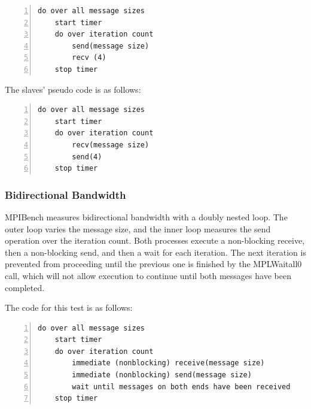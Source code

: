 \begin{minipage}{\textwidth}
\end{minipage}

\begin{minipage}{\linewidth}
\begin{lstlisting}[frame=single,numbers=left]
do over all message sizes 
    start timer
    do over iteration count 
        send(message size) 
        recv (4)
    stop timer
\end{lstlisting}
\end{minipage}

The slaves' pseudo code is as follows:

\begin{minipage}{\textwidth}
\end{minipage}

\begin{minipage}{\textwidth}
\begin{lstlisting}[frame=single,numbers=left]
do over all message sizes 
    start timer
    do over iteration count 
        recv(message size) 
        send(4)
    stop timer
\end{lstlisting}
 \end{minipage}

\subsubsection{Bidirectional Bandwidth}

MPIBench measures bidirectional bandwidth with a doubly nested loop. The outer
loop varies the message size, and the inner loop measures the send operation
over the iteration count. Both processes execute a non-blocking receive, then a
non-blocking send, and then a wait for each iteration. The next iteration is
prevented from proceeding until the previous one is finished by the MPLWaitall0
call, which will not allow execution to continue until both messages have been
completed.

The code for this test is as follows:
 
\begin{minipage}{\textwidth}
\end{minipage}

\begin{minipage}{\textwidth}
\begin{lstlisting}[frame=single,numbers=left]
 do over all message sizes
    start timer
    do over iteration count
        immediate (nonblocking) receive(message size)
        immediate (nonblocking) send(message size)
        wait until messages on both ends have been received
    stop timer
\end{lstlisting}
\end{minipage}

